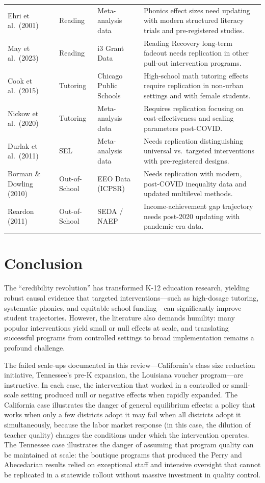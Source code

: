 \documentclass[12pt,letterpaper]{article}
\begin{document}
\begin{longtable}{p{4.5cm} p{2.5cm} p{2cm} p{5.5cm}}
Ehri et al.\ (2001) & Reading & Meta-analysis data & Phonics effect sizes need updating with modern structured literacy trials and pre-registered studies. \\
May et al.\ (2023) & Reading & i3 Grant Data & Reading Recovery long-term fadeout needs replication in other pull-out intervention programs. \\
Cook et al.\ (2015) & Tutoring & Chicago Public Schools & High-school math tutoring effects require replication in non-urban settings and with female students. \\
Nickow et al.\ (2020) & Tutoring & Meta-analysis data & Requires replication focusing on cost-effectiveness and scaling parameters post-COVID. \\
Durlak et al.\ (2011) & SEL & Meta-analysis data & Needs replication distinguishing universal vs.\ targeted interventions with pre-registered designs. \\
Borman \& Dowling (2010) & Out-of-School & EEO Data (ICPSR) & Needs replication with modern, post-COVID inequality data and updated multilevel methods. \\
Reardon (2011) & Out-of-School & SEDA / NAEP & Income-achievement gap trajectory needs post-2020 updating with pandemic-era data. \\
\end{longtable}

\section{Conclusion}

The ``credibility revolution'' has transformed K-12 education research, yielding robust causal evidence that targeted interventions---such as high-dosage tutoring, systematic phonics, and equitable school funding---can significantly improve student trajectories. However, the literature also demands humility: many popular interventions yield small or null effects at scale, and translating successful programs from controlled settings to broad implementation remains a profound challenge.

The failed scale-ups documented in this review---California's class size reduction initiative, Tennessee's pre-K expansion, the Louisiana voucher program---are instructive. In each case, the intervention that worked in a controlled or small-scale setting produced null or negative effects when rapidly expanded. The California case illustrates the danger of general equilibrium effects: a policy that works when only a few districts adopt it may fail when all districts adopt it simultaneously, because the labor market response (in this case, the dilution of teacher quality) changes the conditions under which the intervention operates. The Tennessee case illustrates the danger of assuming that program quality can be maintained at scale: the boutique programs that produced the Perry and Abecedarian results relied on exceptional staff and intensive oversight that cannot be replicated in a statewide rollout without massive investment in quality control.
\end{document}

